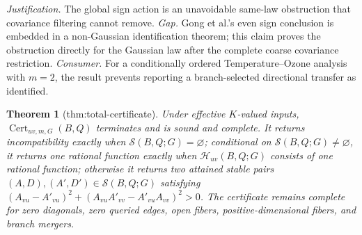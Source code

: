 \documentclass{article}
\newtheorem{theorem}{Theorem}
\begin{document}
\par\smallskip\noindent \textit{Justification.} The global sign action is an unavoidable same-law obstruction that covariance filtering cannot remove. \textit{Gap.} Gong et al.'s even sign conclusion is embedded in a non-Gaussian identification theorem; this claim proves the obstruction directly for the Gaussian law after the complete coarse covariance restriction. \textit{Consumer.} For a conditionally ordered Temperature--Ozone analysis with \(m=2\), the result prevents reporting a branch-selected directional transfer as identified.

\begin{theorem}[thm:total-certificate]\label{thm:total-certificate}
Under effective \(K\)-valued inputs, \(\operatorname{Cert}_{uv,m,G}(B,Q)\) terminates and is sound and complete. It returns incompatibility exactly when \(\mathcal S(B,Q;G)=\varnothing\); conditional on \(\mathcal S(B,Q;G)\ne\varnothing\), it returns one rational function exactly when \(\mathcal H_{uv}(B,Q;G)\) consists of one rational function; otherwise it returns two attained stable pairs \((A,D),(A',D')\in\mathcal S(B,Q;G)\) satisfying \((A_{vu}-A'_{vu})^2+(A_{vu}A'_{vv}-A'_{vu}A_{vv})^2>0\). The certificate remains complete for zero diagonals, zero queried edges, open fibers, positive-dimensional fibers, and branch mergers.
\end{theorem}
\end{document}
